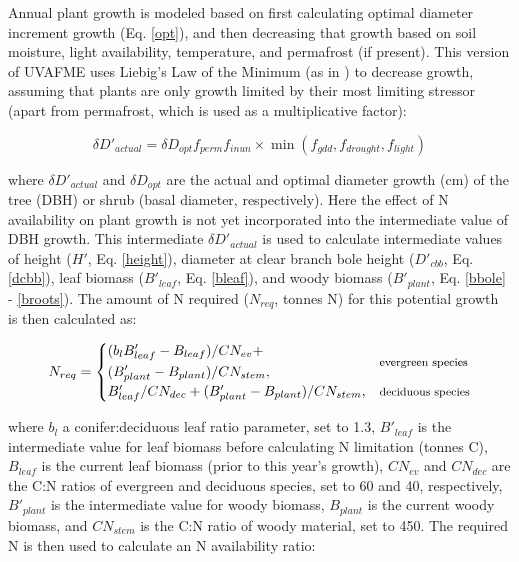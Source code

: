 \documentclass[a4paper, 12pt] {report}
\begin{document}
Annual plant growth is modeled based on first calculating optimal diameter increment growth (Eq. \ref{opt}), and then decreasing that growth based on soil moisture, light availability, temperature, and permafrost (if present). This version of UVAFME uses Liebig's Law of the Minimum (as in ) to decrease growth, assuming that plants are only growth limited by their most limiting stressor (apart from permafrost, which is used as a multiplicative factor):

\begin{equation} 
\delta D'_{actual} = \delta D_{opt}f_{perm}f_{inun} \times \min(f_{gdd}, f_{drought}, f_{light})
\end{equation}

where $\delta D'_{actual}$ and $ \delta D_{opt}$ are the actual and optimal diameter growth (cm) of the tree (DBH) or shrub (basal diameter, respectively). Here the effect of N availability on plant growth is not yet incorporated into the intermediate value of DBH growth. This intermediate $\delta D'_{actual}$ is used to calculate intermediate values of height ($H'$, Eq. \ref{height}), diameter at clear branch bole height ($D'_{cbb}$, Eq. \ref{dcbb}), leaf biomass ($B'_{leaf}$, Eq. \ref{bleaf}), and woody biomass ($B'_{plant}$, Eq. \ref{bbole} - \ref{broots}). The amount of N required ($N_{req}$, tonnes N) for this potential growth is then calculated as:

\begin{equation} \label{Nreq}
N_{req} = \begin{cases}\!
\begin{aligned}
& (b_lB'_{leaf} - B_{leaf})/CN_{ev} + \\
& (B'_{plant} - B_{plant})/CN_{stem}, \end{aligned} & \text{\footnotesize{evergreen species}} \\
B'_{leaf}/CN_{dec} + (B'_{plant} - B_{plant})/CN_{stem}, & \text{\footnotesize{deciduous species}} 
\end{cases}
\end{equation}

where $b_l$ a conifer:deciduous leaf ratio parameter, set to 1.3, $B'_{leaf}$ is the intermediate value for leaf biomass before calculating N limitation (tonnes C), $B_{leaf}$ is the current leaf biomass (prior to this year's growth), $CN_{ev}$ and $CN_{dec}$ are the C:N ratios of evergreen and deciduous species, set to 60 and 40, respectively, $B'_{plant}$ is the intermediate value for woody biomass, $B_{plant}$ is the current woody biomass, and $CN_{stem}$ is the C:N ratio of woody material, set to 450. The required N is then used to calculate an N availability ratio:
\end{document}
